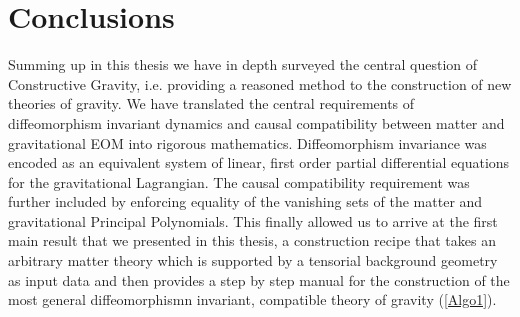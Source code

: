 \documentclass[a4paper,12pt, DIV=14, BCOR=5mm, twoside, headsepline, numbers=noenddot]{scrbook}
\begin{document}
\chapter{Conclusions}
Summing up in this thesis we have in depth surveyed the central question of Constructive Gravity, i.e. providing a reasoned method to the construction of new theories of gravity. We have translated the central requirements of diffeomorphism invariant dynamics and causal compatibility between matter and gravitational EOM into rigorous mathematics. Diffeomorphism invariance was encoded as an equivalent system of linear, first order partial differential equations for the gravitational Lagrangian. The causal compatibility requirement was further included by enforcing equality of the vanishing sets of the matter and gravitational Principal Polynomials.
This finally allowed us to arrive at the first main result that we presented in this thesis, a construction recipe that takes an arbitrary matter theory which is supported by a tensorial background geometry as input data and then provides a step by step manual for the construction of the most general diffeomorphismn invariant, compatible theory of gravity (\ref{Algo1}). 
\end{document}
